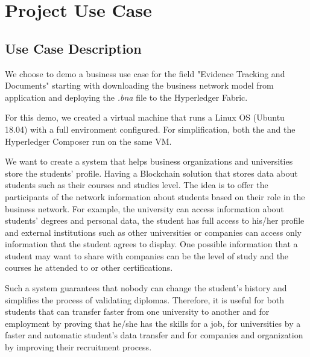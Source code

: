 \chapter{Project Use Case}
\label{chapter:chapter4}

\section{Use Case Description}
\label{sub-sec:chapter4-section1}
We choose to demo a business use case for the field "Evidence Tracking and Documents" starting with downloading the business network model from \project application and deploying the \emph{.bna} file to the Hyperledger Fabric.

For this demo, we created a virtual machine that runs a Linux OS (Ubuntu 18.04) with a full environment configured. For simplification, both the \project and the Hyperledger Composer run on the same VM. 

We want to create a system that helps business organizations and universities store the students' profile. Having a Blockchain solution that stores data about students such as their courses and studies level.
The idea is to offer the participants of the network information about students based on their role in the business network.
For example, the university can access information about students' degrees and personal data, the student has full access to his/her profile and external institutions such as other universities or companies can access only information that the student agrees to display. One possible information that a student may want to share with companies can be the level of study and the courses he attended to or other certifications.

Such a system guarantees that nobody can change the student's history and simplifies the process of validating diplomas. Therefore, it is useful for both students that can transfer faster from one university to another and for employment by proving that he/she has the skills for a job, for universities by a faster and automatic student's data transfer and for companies and organization by improving their recruitment process.

